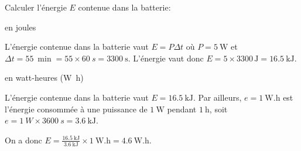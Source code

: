 \bigskip

Calculer l'énergie $E$ contenue dans la batterie:

\minusSmallskip

\debutEntrainement


\begin{enonce}
en joules
\end{enonce}


\begin{corrige}
L'énergie contenue dans la batterie vaut $E=P\Delta t$ où $P=\SI{5}{\watt}$ et $\Delta t=\SI{55}{\min}=\num{55 }\times \SI{60}{s}=\SI{3300}{\second}$. L'énergie vaut donc
$E=5 \times \num{3300} \, \si{\joule}=\SI{16,5}{\kJ}$.
\end{corrige}



\begin{enonce}
en watt-heures (\si{\watt.\hour})
\end{enonce}


\begin{corrige}
L'énergie contenue dans la batterie vaut $E=\SI{16,5}{\kJ}$. Par ailleurs, $e=\SI{1}{\watt.\hour}$ est l'énergie consommée à une puissance de $\SI{1}{\watt}$ pendant $\SI{1}{\hour}$, soit $e=\SI{1}{W}\times \SI{3600}{s} =\SI{3,6}{\kJ}$.

On a donc $E = \frac{\SI{16,5}{\kJ}}{\SI{3,6}{\kJ}} \times \SI{1}{\watt.\hour} = \SI{4,6}{\watt.\hour}$.
\end{corrige}


\finEntrainement





